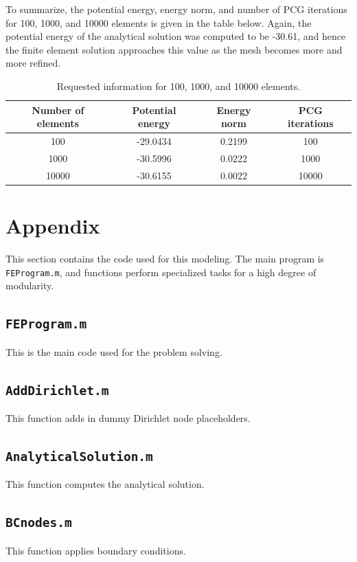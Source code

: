 \documentclass[10pt]{article}
\begin{document}
To summarize, the potential energy, energy norm, and number of PCG iterations for 100, 1000, and 10000 elements is given in the table below. Again, the potential energy of the analytical solution was computed to be -30.61, and hence the finite element solution approaches this value as the mesh becomes more and more refined.

\begin{table}[H]
\caption{Requested information for 100, 1000, and 10000 elements. }
\centering
\begin{tabular}{c c c c}
\hline\hline
Number of elements & Potential energy & Energy norm & PCG iterations\\ [0.5ex]
\hline
100 		& -29.0434  & 0.2199 		& 100\\
1000 	& -30.5996  & 0.0222		& 1000\\
10000 	& -30.6155  & 0.0022	 	& 10000\\
\hline
\end{tabular}
\end{table}

\section{Appendix}

This section contains the code used for this modeling. The main program is \texttt{FEProgram.m}, and functions perform specialized tasks for a high degree of modularity.

\subsection{\texttt{FEProgram.m}}
This is the main code used for the problem solving.


\subsection{\texttt{AddDirichlet.m}}
This function adds in dummy Dirichlet node placeholders.


\subsection{\texttt{AnalyticalSolution.m}}
This function computes the analytical solution.


\subsection{\texttt{BCnodes.m}}
This function applies boundary conditions.

\end{document}
